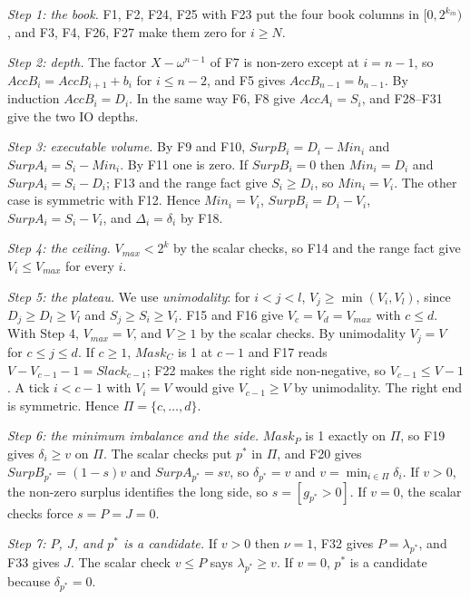 \emph{Step 1: the book.} F1, F2, F24, F25 with F23 put the four book columns in \([0, 2^{k_{in}})\), and F3, F4, F26, F27 make them zero for \(i \ge N\).

\emph{Step 2: depth.} The factor \(X - \omega^{n-1}\) of F7 is non-zero except at \(i = n-1\), so \(AccB_i = AccB_{i+1} + b_i\) for \(i \le n-2\), and F5 gives \(AccB_{n-1} = b_{n-1}\). By induction \(AccB_i = D_i\). In the same way F6, F8 give \(AccA_i = S_i\), and F28--F31 give the two IO depths.

\emph{Step 3: executable volume.} By F9 and F10, \(SurpB_i = D_i - Min_i\) and \(SurpA_i = S_i - Min_i\). By F11 one is zero. If \(SurpB_i = 0\) then \(Min_i = D_i\) and \(SurpA_i = S_i - D_i\); F13 and the range fact give \(S_i \ge D_i\), so \(Min_i = V_i\). The other case is symmetric with F12. Hence \(Min_i = V_i\), \(SurpB_i = D_i - V_i\), \(SurpA_i = S_i - V_i\), and \(\Delta_i = \delta_i\) by F18.

\emph{Step 4: the ceiling.} \(V_{max} < 2^k\) by the scalar checks, so F14 and the range fact give \(V_i \le V_{max}\) for every \(i\).

\emph{Step 5: the plateau.} We use \emph{unimodality}: for \(i < j < l\), \(V_j \ge \min(V_i, V_l)\), since \(D_j \ge D_l \ge V_l\) and \(S_j \ge S_i \ge V_i\). F15 and F16 give \(V_c = V_d = V_{max}\) with \(c \le d\). With Step 4, \(V_{max} = V\), and \(V \ge 1\) by the scalar checks. By unimodality \(V_j = V\) for \(c \le j \le d\). If \(c \ge 1\), \(Mask_C\) is 1 at \(c - 1\) and F17 reads \(V - V_{c-1} - 1 = Slack_{c-1}\); F22 makes the right side non-negative, so \(V_{c-1} \le V - 1\). A tick \(i < c-1\) with \(V_i = V\) would give \(V_{c-1} \ge V\) by unimodality. The right end is symmetric. Hence \(\Pi = \{c, \ldots, d\}\).

\emph{Step 6: the minimum imbalance and the side.} \(Mask_P\) is 1 exactly on \(\Pi\), so F19 gives \(\delta_i \ge v\) on \(\Pi\). The scalar checks put \(p^*\) in \(\Pi\), and F20 gives \(SurpB_{p^*} = (1-s)v\) and \(SurpA_{p^*} = sv\), so \(\delta_{p^*} = v\) and \(v = \min_{i \in \Pi} \delta_i\). If \(v > 0\), the non-zero surplus identifies the long side, so \(s = [g_{p^*} > 0]\). If \(v = 0\), the scalar checks force \(s = P = J = 0\).

\emph{Step 7: \(P\), \(J\), and \(p^*\) is a candidate.} If \(v > 0\) then \(\nu = 1\), F32 gives \(P = \lambda_{p^*}\), and F33 gives \(J\). The scalar check \(v \le P\) says \(\lambda_{p^*} \ge v\). If \(v = 0\), \(p^*\) is a candidate because \(\delta_{p^*} = 0\).

